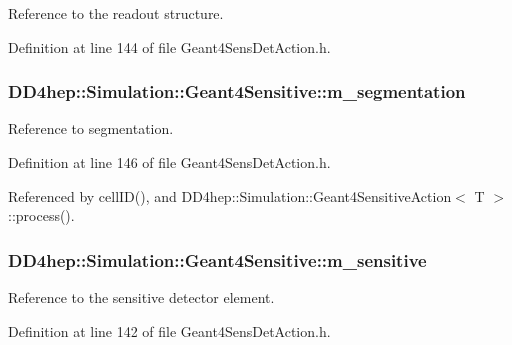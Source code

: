 Reference to the readout structure. 

Definition at line 144 of file Geant4SensDetAction.h.\hypertarget{class_d_d4hep_1_1_simulation_1_1_geant4_sensitive_ab7817460de763632e629982ca4c2c847}{
\subsubsection[{m\_\-segmentation}]{ {\bf DD4hep::Simulation::Geant4Sensitive::m\_\-segmentation}}}
\label{class_d_d4hep_1_1_simulation_1_1_geant4_sensitive_ab7817460de763632e629982ca4c2c847}


Reference to segmentation. 

Definition at line 146 of file Geant4SensDetAction.h.

Referenced by cellID(), and DD4hep::Simulation::Geant4SensitiveAction$<$ T $>$::process().\hypertarget{class_d_d4hep_1_1_simulation_1_1_geant4_sensitive_a02ba3b720aadf6e230b6c2c0cd258b2b}{
\subsubsection[{m\_\-sensitive}]{ {\bf DD4hep::Simulation::Geant4Sensitive::m\_\-sensitive}}}
\label{class_d_d4hep_1_1_simulation_1_1_geant4_sensitive_a02ba3b720aadf6e230b6c2c0cd258b2b}


Reference to the sensitive detector element. 

Definition at line 142 of file Geant4SensDetAction.h.

